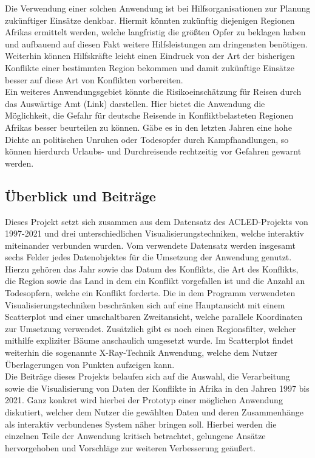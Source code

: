 \documentclass[usegeometry=true]{scrartcl}
\begin{document}
Die Verwendung einer solchen Anwendung ist bei Hilfsorganisationen zur Planung zukünftiger Einsätze denkbar. Hiermit könnten zukünftig diejenigen Regionen Afrikas ermittelt werden, welche langfristig die größten Opfer zu beklagen haben und aufbauend auf diesen Fakt weitere Hilfsleistungen am dringensten benötigen. Weiterhin können Hilfskräfte leicht einen Eindruck von der Art der bisherigen Konflikte einer bestimmten Region bekommen und damit zukünftige Einsätze besser auf diese Art von Konflikten vorbereiten.\\

Ein weiteres Anwendungsgebiet könnte die Risikoeinschätzung für Reisen durch das Auswärtige Amt (Link) darstellen. Hier bietet die Anwendung die Möglichkeit, die Gefahr für deutsche Reisende in Konfliktbelasteten Regionen Afrikas besser beurteilen zu können. Gäbe es in den letzten Jahren eine hohe Dichte an politischen Unruhen oder Todesopfer durch Kampfhandlungen, so können hierdurch Urlaubs- und Durchreisende rechtzeitig vor Gefahren gewarnt werden.

\subsection{Überblick und Beiträge}
Dieses Projekt setzt sich zusammen aus dem Datensatz des ACLED-Projekts von 1997-2021 und drei unterschiedlichen Visualisierungstechniken, welche interaktiv miteinander verbunden wurden. Vom verwendete Datensatz werden insgesamt sechs Felder jedes Datenobjektes für die Umsetzung der Anwendung genutzt. Hierzu gehören das Jahr sowie das Datum des Konflikts, die Art des Konflikts, die Region sowie das Land in dem ein Konflikt vorgefallen ist und die Anzahl an Todesopfern, welche ein Konflikt forderte. Die in dem Programm verwendeten Visualisierungstechniken beschränken sich auf eine Hauptansicht mit einem Scatterplot und einer umschaltbaren Zweitansicht, welche parallele Koordinaten zur Umsetzung verwendet. Zusätzlich gibt es noch einen Regionsfilter, welcher mithilfe expliziter Bäume anschaulich umgesetzt wurde. Im Scatterplot findet weiterhin die sogenannte X-Ray-Technik Anwendung, welche dem Nutzer Überlagerungen von Punkten aufzeigen kann. \\

Die Beiträge dieses Projekts belaufen sich auf die Auswahl, die Verarbeitung sowie die Visualisierung von Daten der Konflikte in Afrika in den Jahren 1997 bis 2021. Ganz konkret wird hierbei der Prototyp einer möglichen Anwendung diskutiert, welcher dem Nutzer die gewählten Daten und deren Zusammenhänge als interaktiv verbundenes System näher bringen soll. Hierbei werden die einzelnen Teile der Anwendung kritisch betrachtet, gelungene Ansätze hervorgehoben und Vorschläge zur weiteren Verbesserung geäußert.
\end{document}
